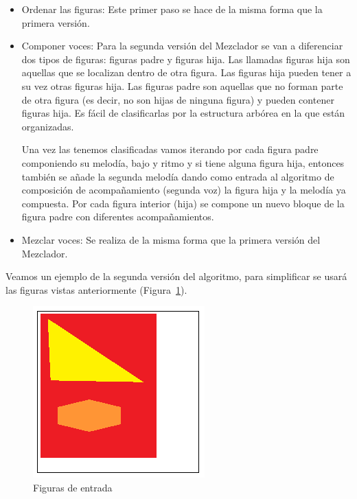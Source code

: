 \begin{itemize}
	\item Ordenar las figuras: Este primer paso se hace de la misma forma que la primera versión.

	\item Componer voces: Para la segunda versión del Mezclador se van a diferenciar dos tipos de figuras: figuras padre y figuras hija. Las llamadas figuras hija son aquellas que se localizan dentro de otra figura. Las figuras hija pueden tener a su vez otras figuras hija. Las figuras padre son aquellas que no forman parte de otra figura (es decir, no son hijas de ninguna figura) y pueden contener figuras hija. Es fácil de clasificarlas por la estructura arbórea en la que están organizadas.

Una vez las tenemos clasificadas vamos iterando por cada figura padre componiendo su melodía, bajo y ritmo y si tiene alguna figura hija, entonces también se añade la segunda melodía dando como entrada al algoritmo de composición de acompañamiento (segunda voz) la figura hija y la melodía ya compuesta. Por cada figura interior (hija) se compone un nuevo bloque de la figura padre con diferentes acompañamientos.

	\item Mezclar voces: Se realiza de la misma forma que la primera versión del Mezclador.

\end{itemize}

Veamos un ejemplo de la segunda versión del algoritmo, para simplificar se usará las figuras vistas anteriormente (Figura~\ref{fig:Figura0Mixer}).

		\begin{figure}[!htbp]
		\centering
		\hspace*{0.0in}
		\includegraphics[scale=1]{graphics/simpletest5.png}
		\caption{Figuras de entrada}
		\label{fig:Figura0Mixer}
		\end{figure}

